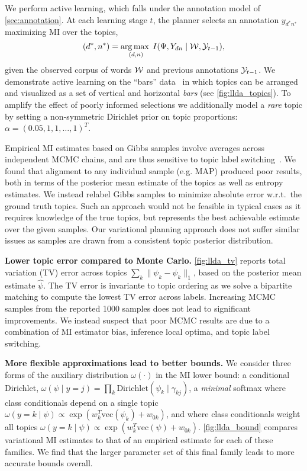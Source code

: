 We perform active learning, which falls under the annotation model of
\SEC\ref{sec:annotation}.  At each learning stage $t$, the planner
selects an annotation $y_{d^*n^*}$ maximizing MI over the topics,
\begin{equation}
  (d^*,n^*) = \operatorname*{arg\,max\;}_{(d,n)} I(\Psi, Y_{dn} \mid \mathcal{W}, \mathcal{Y}_{t-1}),
\end{equation}
given the observed corpus of words $\mathcal{W}$ and previous annotations
$\mathcal{Y}_{t-1}$.  We demonstrate active learning on the ``bars''
data~\citep{griffiths2004finding} in which topics can be arranged and
visualized as a set of vertical and horizontal \emph{bars} (see
\FIG\ref{fig:llda_topics}).  To amplify the effect of poorly informed
selections we additionally model a \emph{rare} topic by setting a
non-symmetric Dirichlet prior on topic proportions: $\alpha = (0.05,
1, 1, \ldots, 1)^T$.

Empirical MI estimates based on Gibbs samples involve averages across
independent MCMC chains, and are thus sensitive to topic label
switching~\citep{stephens2000dealing}.  We found that alignment to any
individual sample (e.g. MAP) produced poor results, both in terms of
the posterior mean estimate of the topics as well as entropy
estimates.  We instead relabel Gibbs samples to minimize absolute
error w.r.t.~the ground truth topics.  Such an approach would not be
feasible in typical cases as it requires knowledge of the true topics,
but represents the best achievable estimate over the given samples.  Our
variational planning approach does not suffer similar issues as
samples are drawn from a consistent topic posterior distribution.

\textbf{Lower topic error compared to Monte Carlo.}
\FIG\ref{fig:llda_tv} reports total variation (TV) error across topics
$\sum_k \|\psi_k - \hat{\psi}_k\|_1$, based on the posterior mean
estimate $\hat{\psi}$.  The TV error is invariante to topic ordering
as we solve a bipartite matching to compute the lowest TV error across
labels.  Increasing MCMC samples from the reported 1000 samples does
not lead to significant improvements.  We instead suspect that poor
MCMC results are due to a combination of MI estimator bias, inference
local optima, and topic label switching.

\textbf{More flexible approximations lead to better bounds.}  We
consider three forms of the auxiliary distribution $\omega(\cdot)$ in
the MI lower bound: a conditional Dirichlet, $\omega(\psi \mid y=j) =
\prod_k \text{Dirichlet}(\psi_k \mid \gamma_{kj})$, a \emph{minimal}
softmax where class conditionals depend on a single topic $\omega(y =
k \mid \psi) \propto \exp( w_k^T \text{vec}(\psi_k) + w_{0k} )$, and
where class conditionals weight all topics \mbox{$\omega(y = k \mid
  \psi) \propto \exp( w_k^T \text{vec}(\psi) + w_{0k}
  )$}. \FIG\ref{fig:llda_bound} compares variational MI estimates to
that of an empirical estimate for each of these families.  We find
that the larger parameter set of this final family leads to more
accurate bounds overall.



